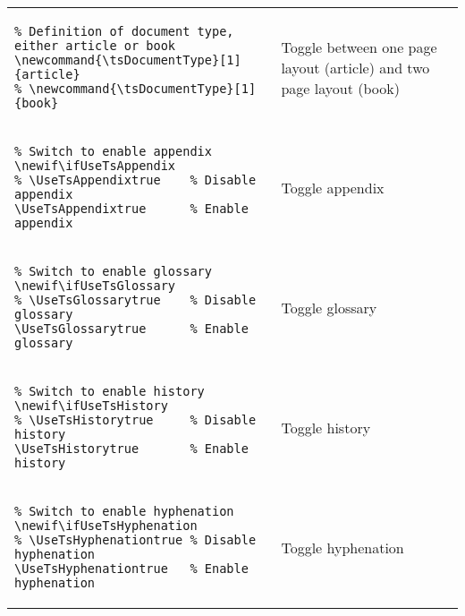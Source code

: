 \begin{footnotesize}
    \renewcommand*{\arraystretch}{1.5}
    \begin{longtable}{ | P{0.7\textwidth} | p{0.23\textwidth} | }
        \hline
         &          \\
        \hline
        \begin{BVerbatim}
\newcommand{\tsDocumentType}[1]{article}
        \end{BVerbatim}
         & Toggle between one page layout (article) and two page layout (book)  \\
        \hline
        \begin{BVerbatim}
\newif\ifUseTsAppendix
\UseTsAppendixtrue      %
        \end{BVerbatim}
         & Toggle appendix                   \\
        \hline
        \begin{BVerbatim}
\newif\ifUseTsGlossary
\UseTsGlossarytrue      %
        \end{BVerbatim}
         & Toggle glossary                   \\
        \hline
        \begin{BVerbatim}
\newif\ifUseTsHistory
\UseTsHistorytrue       %
        \end{BVerbatim}
         & Toggle history                    \\
        \hline
        \begin{BVerbatim}
\newif\ifUseTsHyphenation
\UseTsHyphenationtrue   %
        \end{BVerbatim}
         & Toggle \newline  hyphenation      \\

\end{longtable}
\end{footnotesize}
